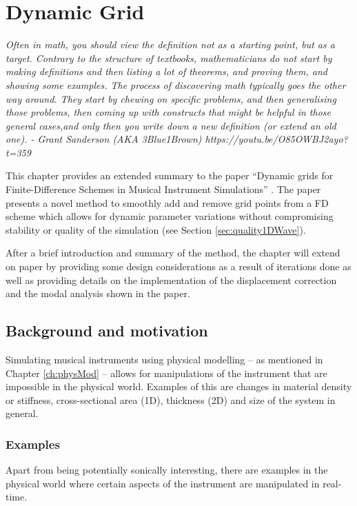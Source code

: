 \chapter{Dynamic Grid}\label{ch:dynamicGrid}

\textit{Often in math, you should view the definition not as a starting point, but as a target. Contrary to the structure of textbooks, mathematicians do not start by making definitions and then listing a lot of theorems, and proving them, and showing some examples. The process of discovering math typically goes the other way around. They start by chewing on specific problems, and then generalising those problems, then coming up with constructs that might be helpful in those general cases,and only then you write down a new definition (or extend an old one). - Grant Sanderson (AKA 3Blue1Brown) https://youtu.be/O85OWBJ2ayo?t=359}

This chapter provides an extended summary to the paper ``Dynamic grids for Finite-Difference Schemes in Musical Instrument Simulations'' \citeP[G]. The paper presents a novel method to smoothly add and remove grid points from a FD scheme which allows for dynamic parameter variations without compromising stability or quality of the simulation (see Section \ref{sec:quality1DWave}). 

After a brief introduction  and summary of the method, the chapter will extend on paper \citeP[G] by providing some design considerations as a result of iterations done as well as providing details on the implementation of the displacement correction and the modal analysis shown in the paper. 

\section{Background and motivation}
Simulating musical instruments using physical modelling -- as mentioned in Chapter \ref{ch:physMod} -- allows for manipulations of the instrument that are impossible in the physical world. Examples of this are changes in material density or stiffness, cross-sectional area (1D), thickness (2D) and size of the system in general. 



\subsection{Examples}
Apart from being potentially sonically interesting, there are examples in the physical world where certain aspects of the instrument are manipulated in real-time.

